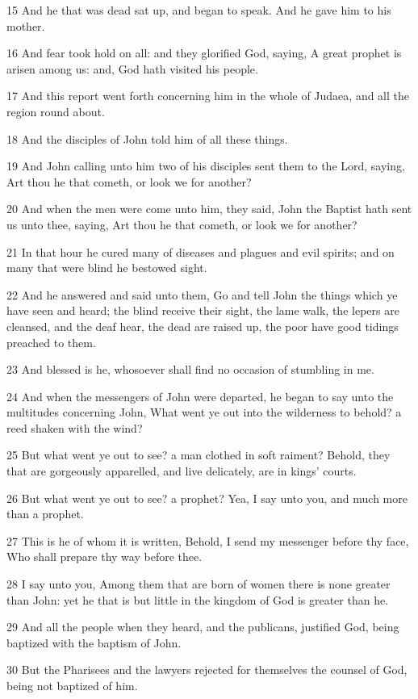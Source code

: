 \par 15 And he that was dead sat up, and began to speak. And he gave him to his mother.
\par 16 And fear took hold on all: and they glorified God, saying, A great prophet is arisen among us: and, God hath visited his people.
\par 17 And this report went forth concerning him in the whole of Judaea, and all the region round about.
\par 18 And the disciples of John told him of all these things.
\par 19 And John calling unto him two of his disciples sent them to the Lord, saying, Art thou he that cometh, or look we for another?
\par 20 And when the men were come unto him, they said, John the Baptist hath sent us unto thee, saying, Art thou he that cometh, or look we for another?
\par 21 In that hour he cured many of diseases and plagues and evil spirits; and on many that were blind he bestowed sight.
\par 22 And he answered and said unto them, Go and tell John the things which ye have seen and heard; the blind receive their sight, the lame walk, the lepers are cleansed, and the deaf hear, the dead are raised up, the poor have good tidings preached to them.
\par 23 And blessed is he, whosoever shall find no occasion of stumbling in me.
\par 24 And when the messengers of John were departed, he began to say unto the multitudes concerning John, What went ye out into the wilderness to behold? a reed shaken with the wind?
\par 25 But what went ye out to see? a man clothed in soft raiment? Behold, they that are gorgeously apparelled, and live delicately, are in kings' courts.
\par 26 But what went ye out to see? a prophet? Yea, I say unto you, and much more than a prophet.
\par 27 This is he of whom it is written, Behold, I send my messenger before thy face, Who shall prepare thy way before thee.
\par 28 I say unto you, Among them that are born of women there is none greater than John: yet he that is but little in the kingdom of God is greater than he.
\par 29 And all the people when they heard, and the publicans, justified God, being baptized with the baptism of John.
\par 30 But the Pharisees and the lawyers rejected for themselves the counsel of God, being not baptized of him.
